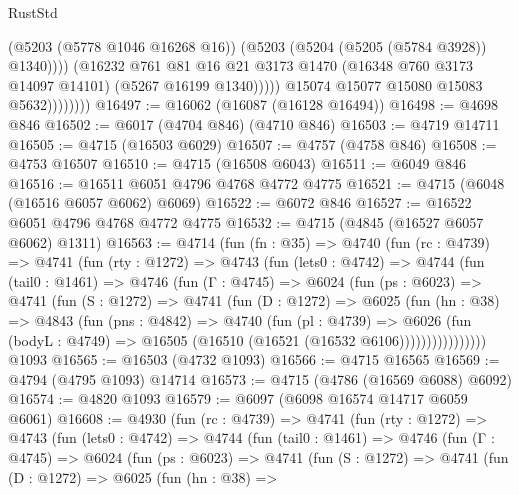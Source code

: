 \begin{lexlean}{RustStd}
\begin{coremodule}
                              (@5203 (@5778 @1046 @16268 @16))
                              (@5203 (@5204 (@5205 (@5784 @3928)) @1340))))
                          (@16232
                            @761
                            @81
                            @16
                            @21
                            @3173
                            @1470
                            (@16348 @760 @3173 @14097 @14101)
                            (@5267 @16199 @1340)))))
                    @15074
                    @15077
                    @15080
                    @15083
                    @5632))))))))
@16497 := @16062 (@16087 (@16128 @16494))
@16498 := @4698 @846
@16502 := @6017 (@4704 @846) (@4710 @846)
@16503 := @4719 @14711
@16505 := @4715 (@16503 @6029)
@16507 := @4757 (@4758 @846)
@16508 := @4753 @16507
@16510 := @4715 (@16508 @6043)
@16511 := @6049 @846
@16516 := @16511 @6051 @4796 @4768 @4772 @4775
@16521 := @4715 (@6048 (@16516 @6057 @6062) @6069)
@16522 := @6072 @846
@16527 := @16522 @6051 @4796 @4768 @4772 @4775
@16532 := @4715 (@4845 (@16527 @6057 @6062) @1311)
@16563 := @4714
    (fun (fn : @35) =>
    @4740
      (fun (rc : @4739) =>
      @4741
        (fun (rty : @1272) =>
        @4743
          (fun (lets0 : @4742) =>
          @4744
            (fun (tail0 : @1461) =>
            @4746
              (fun (Γ : @4745) =>
              @6024
                (fun (ps : @6023) =>
                @4741
                  (fun (S : @1272) =>
                  @4741
                    (fun (D : @1272) =>
                    @6025
                      (fun (hn : @38) =>
                      @4843
                        (fun (pns : @4842) =>
                        @4740
                          (fun (pl : @4739) =>
                          @6026
                            (fun (bodyL : @4749) =>
                            @16505 (@16510 (@16521 (@16532 @6106))))))))))))))))
    @1093
@16565 := @16503 (@4732 @1093)
@16566 := @4715 @16565
@16569 := @4794 (@4795 @1093) @14714
@16573 := @4715 (@4786 (@16569 @6088) @6092)
@16574 := @4820 @1093
@16579 := @6097 (@6098 @16574 @14717 @6059 @6061)
@16608 := @4930
    (fun (rc : @4739) =>
    @4741
      (fun (rty : @1272) =>
      @4743
        (fun (lets0 : @4742) =>
        @4744
          (fun (tail0 : @1461) =>
          @4746
            (fun (Γ : @4745) =>
            @6024
              (fun (ps : @6023) =>
              @4741
                (fun (S : @1272) =>
                @4741
                  (fun (D : @1272) =>
                  @6025
                    (fun (hn : @38) =>

\end{coremodule}
\end{lexlean}

